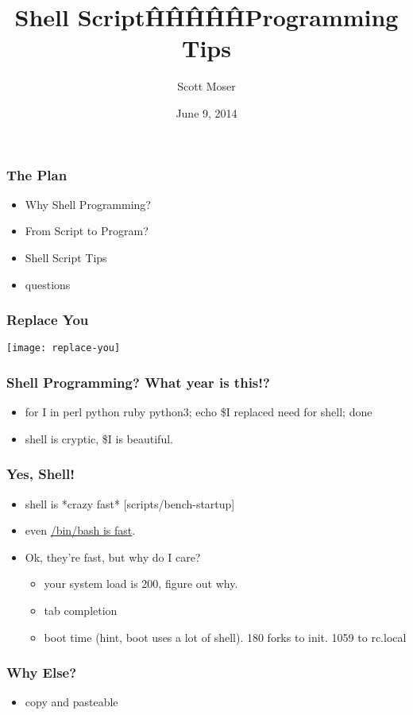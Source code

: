 \documentclass{beamer}
\author{Scott Moser}
\title{Shell Script\^H\^H\^H\^H\^HProgramming Tips}
\institute{Michigan!/usr/group}
\date{June 9, 2014}
\begin{document}
\begin{frame}[t,plain]
    \titlepage
\end{frame}

\begin{frame}
   \frametitle{The Plan}
   \begin{itemize}
      \item Why Shell Programming?
      \item From Script to Program?
      \item Shell Script Tips
      \item questions
   \end{itemize}
\end{frame}

\begin{frame}
   \frametitle{Replace You}
   \texttt{[image: replace-you]}
\end{frame}

\begin{frame}
   \frametitle{Shell Programming?  What year is this!?}
   \begin{itemize}
      \item for I in perl python ruby python3; echo \$I replaced need for shell; done
      \item shell is cryptic, \$I is beautiful.
   \end{itemize}
\end{frame}

\begin{frame}
   \frametitle{Yes, Shell!}
   \begin{itemize}
      \item shell is *crazy fast* [scripts/bench-startup]
      \item even \href{https://gist.github.com/smoser/9780744}{/bin/bash is fast}.
      \item Ok, they're fast, but why do I care?
      \begin{itemize}
         \item your system load is 200, figure out why.
         \item tab completion
         \item boot time (hint, boot uses a lot of shell). 180 forks to init. 1059 to rc.local
      \end{itemize}
   \end{itemize}
\end{frame}

\begin{frame}
   \frametitle{Why Else?}
   \begin{itemize}
      \item copy and pasteable
   \end{itemize}
\end{frame}
\end{document}
